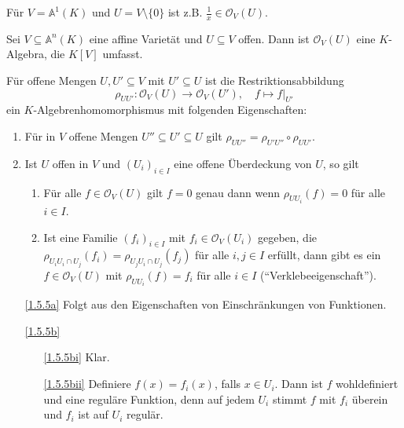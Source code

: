\documentclass[a4paper,12pt]{scrbook}
\makeatletter
\theoremstyle{blah}
\theoremstyle{stz}
\renewcommand{\proofname}{Beweis}
\renewenvironment{proof}[1][\proofname]{\par
  \pushQED{\qed}%
  \normalfont \topsep6\p@\@plus6\p@\relax
  \trivlist
  \item[\hskip\labelsep
        \itshape
    #1\@addpunct{:}]\ignorespaces
}{%
  \popQED\endtrivlist\@endpefalse
}
\def\A{\mathbb{A}}
\def\O{\mathcal{O}}
\newcommand{\ra}{\longrightarrow}
\newcommand{\restrict}[1]{|_{#1}}
\renewcommand{\mapsto}{\longmapsto}
\makeatother
\begin{document}
\begin{bsp*}
  Für $V=\A^1(K)$ und $U=V\setminus\{0\}$ ist z.B. $\frac1x\in\O_V(U)$.
\end{bsp*}

\begin{bem}\label{1.5.4}
  Sei $V\subseteq\A^n(K)$ eine affine Varietät und $U\subseteq V$ offen. Dann ist $\O_V(U)$ eine $K$-Algebra, die $K[V]$
  umfasst.
\end{bem}

\begin{bem}\label{1.5.5}
  Für offene Mengen $U,U'\subseteq V$ mit $U'\subseteq U$ ist die Restriktionsabbildung
  \[ \rho_{UU'}\colon \O_V(U)\ra\O_V(U'),\quad f\mapsto f\restrict{U'} \]
  ein $K$-Algebrenhomomorphismus mit folgenden Eigenschaften:
  \begin{enumerate}
  \item\label{1.5.5a} Für in $V$ offene Mengen $U''\subseteq U'\subseteq U$ gilt $\rho_{UU''}=\rho_{U'U''}\circ\rho_{UU'}$.
  \item\label{1.5.5b} Ist $U$ offen in $V$ und $(U_i)_{i\in I}$ eine offene Überdeckung von $U$, so gilt
    \begin{enumerate}
    \item\label{1.5.5bi} Für alle $f\in\O_V(U)$ gilt $f=0$ genau dann wenn $\rho_{UU_i}(f)=0$ für alle $i\in I$.
    \item\label{1.5.5bii} Ist eine Familie $(f_i)_{i\in I}$ mit $f_i\in\O_V(U_i)$ gegeben, die $\rho_{U_iU_i\cap
        U_j}(f_i)=\rho_{U_jU_i\cap U_j}(f_j)$  für alle $i,j\in I$ erfüllt, dann gibt es ein $f\in\O_V(U)$ mit
      $\rho_{UU_i}(f)=f_i$ für alle $i\in I$
      (\enquote{Verklebeeigenschaft}).
    \end{enumerate}
  \end{enumerate}
\end{bem}
\begin{proof}
  \begin{enumerate}
  \item[\ref{1.5.5a}] Folgt aus den Eigenschaften von Einschränkungen von Funktionen.
  \item[\ref{1.5.5b}]
    \begin{enumerate}
    \item[\ref{1.5.5bi}] Klar.
    \item[\ref{1.5.5bii}] Definiere $f(x)=f_i(x)$, falls $x\in U_i$. Dann ist $f$ wohldefiniert und eine reguläre Funktion, denn
      auf jedem $U_i$  stimmt $f$ mit $f_i$ überein und $f_i$ ist auf $U_i$ regulär.
    \end{enumerate}
  \end{enumerate}
\end{proof}
\end{document}
